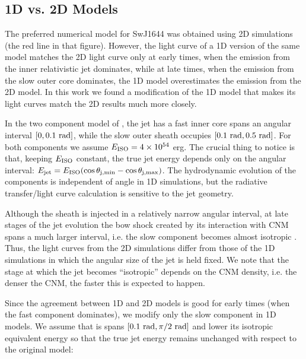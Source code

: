 \documentclass[usenatbib,fleqn]{mnras}
\begin{document}
\subsection{1D vs. 2D Models}
\label{sec:2D}

The preferred numerical model for SwJ1644 \citep[Fig.10
in][]{Mimica+2015} was obtained using 2D simulations (the red line in
that figure). However, the light curve of a 1D version of the same
model \citep[black line in Fig. 10 in][see also section 4.2 of that
paper]{Mimica+2015} matches the 2D light curve only at early times,
when the emission from the inner relativistic jet dominates, while at
late times, when the emission from the slow outer core dominates, the
1D model overestimates the emission from the 2D model. In this work we
found a modification of the 1D model that makes its light curves
match the 2D results much more closely.

In the two component model of \citet{Mimica+2015}, the jet has a fast
inner core spans an angular interval $[0, 0.1\ {\rm rad}]$, while the
slow outer sheath occupies $[0.1\ {\rm rad}, 0.5\ {\rm rad}]$. For
both components we assume $E_{\rm ISO} = 4\times 10^{54}$ erg. The
crucial thing to notice is that, keeping $E_{\rm ISO}$ constant, the
true jet energy depends only on the angular interval: $E_{\rm jet} =
E_{\rm ISO} (\cos\theta_{\rm j,min} - \cos\theta_{\rm j,max})$. The
hydrodynamic evolution of the components is independent of angle in 1D
simulations, but the radiative transfer/light curve calculation is
sensitive to the jet geometry.

Although the sheath is injected in a relatively
narrow angular interval, at late stages of the jet evolution the bow
shock created by its interaction with CNM spans a much larger interval,
i.e. the slow component becomes almost isotropic \citep[bottom two
panels in Fig. 8 in][]{Mimica+2015}. Thus, the light curves from the
2D simulations differ from those of the 1D simulations in which the
angular size of the jet is held fixed. We note that the stage at
which the jet becomes ``isotropic'' depends on the CNM density,
i.e. the denser the CNM, the faster this is expected to happen.

Since the agreement between 1D and 2D models is good for early times
(when the fast component dominates), we modify only the slow component
in 1D models. We assume that is spans $[0.1\ {\rm rad}, \pi/2\ {\rm
  rad}]$ and lower its isotropic equivalent energy so that the true
jet energy remains unchanged with respect to the original model:
\end{document}
